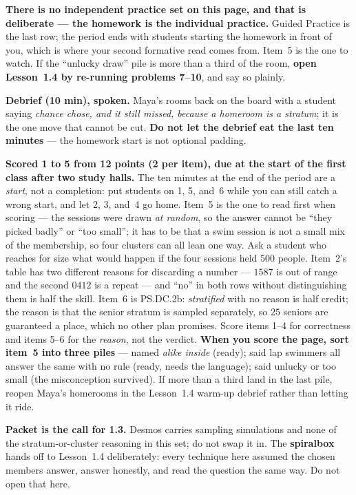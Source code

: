 \documentclass[10pt]{article}
\begin{document}
\begin{teachernote}
\textbf{There is no independent practice set on this page, and that is deliberate --- the
homework is the individual practice.} Guided Practice is the last row; the period
ends with students starting the homework in front of you, which is where your second formative
read comes from. Item~5 is the one to watch. If the ``unlucky draw'' pile is more than a third
of the room, \textbf{open Lesson~1.4 by re-running problems 7--10}, and say so
plainly.

\textbf{Debrief (10 min), spoken.} Maya's rooms back on the board with a student saying
\emph{chance chose, and it still missed, because a homeroom is a stratum}; it is the one move
that cannot be cut. \textbf{Do not let the debrief eat the last ten minutes} --- the homework
start is not optional padding.
\end{teachernote}

\begin{teachernote}[Homework]
\textbf{Scored 1 to 5 from 12 points (2 per item), due at the start of the first class after two study
halls.} The ten minutes at the end of the period are a \emph{start}, not a completion: put
students on 1, 5, and~6 while you can still catch a wrong start, and let 2, 3, and~4 go home.
Item~5 is the one to read first when scoring --- the sessions were drawn \emph{at random}, so
the answer cannot be ``they picked badly'' or ``too small''; it has to be that a swim session
is not a small mix of the membership, so four clusters can all lean one way. Ask a student who
reaches for size what would happen if the four sessions held $500$ people. Item~2's table has
two different reasons for discarding a number --- $1587$ is out of range and the second $0412$
is a repeat --- and ``no'' in both rows without distinguishing them is half the skill. Item~6 is
PS.DC.2b: \emph{stratified} with no reason is half credit; the reason is that the senior stratum
is sampled separately, so $25$ seniors are guaranteed a place, which no other plan promises.
Score items 1--4 for correctness and items 5--6 for the \emph{reason}, not the verdict.
\textbf{When you score the page, sort item~5 into three piles} --- named \emph{alike inside}
(ready); said lap swimmers all answer the same with no rule (ready, needs the language); said
unlucky or too small (the misconception survived). If more than a third land in the last pile,
reopen Maya's homerooms in the Lesson~1.4 warm-up debrief rather than letting it ride.

\textbf{Packet is the call for 1.3.} Desmos carries sampling simulations and none of the
stratum-or-cluster reasoning in this set; do not swap it in. The \textbf{spiralbox} hands off to
Lesson~1.4 deliberately: every technique here assumed the chosen members answer, answer
honestly, and read the question the same way. Do not open that here.
\end{teachernote}
\end{document}
